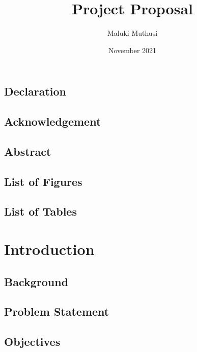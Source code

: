 \documentclass{report}
\title{Project Proposal}
\author{Maluki Muthusi}
\date{November 2021}
\begin{document}


\section{Declaration}

\newpage

\section{Acknowledgement}

\newpage

\section{Abstract}

\newpage




\section{List of Figures}

\section{List of Tables}


\chapter{Introduction}


\section{Background}


\section{Problem Statement}


\section{Objectives}

\end{document}

